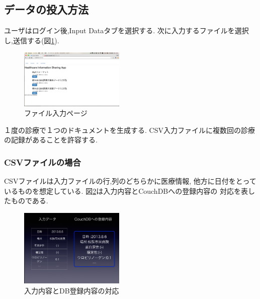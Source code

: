 \subsection{データの投入方法}
	ユーザはログイン後,Input Dataタブを選択する.
	次に入力するファイルを選択し,送信する(図\ref{fileiopage}).

	\begin{figure}[htbp]
			\includegraphics[width=5cm, bb=0 0 437 688]{./gazou/fileiopage.png}
		\caption{ファイル入力ページ}
		\label{fileiopage}
	\end{figure}

	１度の診療で１つのドキュメントを生成する.
	CSV入力ファイルに複数回の診療の記録があることを許容する.

		\subsubsection{CSVファイルの場合}
			CSVファイルは入力ファイルの行,列のどちらかに医療情報,
			他方に日付をとっているものを想定している.
			図\ref{csv-data-trans}は入力内容とCouchDBへの登録内容の
			対応を表したものである.

			\begin{figure}[htbp]
					\includegraphics[width=5cm, bb=0 0 437 688]{./gazou/csv-data-trans2.png}
				\caption{入力内容とDB登録内容の対応}
				\label{csv-data-trans}
			\end{figure}

